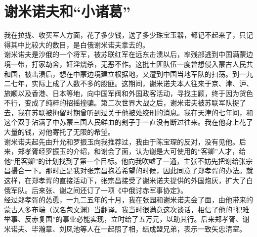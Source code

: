 \fancyhead[RO]{} %
\fancyhead[LE]{} %
\chapter*{谢米诺夫和“小诸葛”}
\thispagestyle{empty}
我在拉拢、收买军人方面，花了多少钱，送了多少珠宝玉器，都记不起来了，只记得其中比较大的数目，是白俄谢米诺夫拿去的。\\

谢米诺夫是沙俄的一个将军，被苏联红军在远东击溃以后，率残部逃到中国满蒙边境一带，打家劫舍，奸淫烧杀，无恶不作。这批土匪队伍一度曾想侵入蒙古人民共和国，被击溃后，想在中蒙边境建立根据地，又遭到中国当地军队的扫荡。到一九二七年，实际上成了人数不多的股匪。这期间，谢米诺夫本人往来于京、津、沪、旅顺以及香港、日本等地，向中国军阀和外国政客活动，寻找主顾，终于因为货色不行，变成了纯粹的招摇撞骗。第二次世界大战之后，谢米诺夫被苏联军队捉了去，我在苏联被拘留时期曾听到过关于他被处绞刑的消息。我在天津的七年间，和这个双手沾满了中苏蒙三国人民鲜血的刽子手一直没有断过往来。我在他身上花了大量的钱，对他寄托了无限的希望。\\

谢米诺夫起先由升允和罗振玉向我推荐过，我由于陈宝琛的反对，没有见他。后来，郑孝胥经罗振玉的介绍，和谢会了面，认为谢是大可使用的“客卿”人才，给他“用客卿”的计划找到了第一个目标。他向我吹嘘了一通，主张不妨先把谢给张宗昌撮合一下。那时正是我对张宗昌抱着希望的时候，因此同意了郑孝胥的办法。就这样，在郑孝胥的直接活动下，张宗昌接受了谢米诺夫提供的外国炮灰，扩大了白俄军队。后来张、谢之间还订了一项《中俄讨赤军事协定》。\\

经过郑孝胥的怂恿，一九二五年的十月，我在张园和谢米诺夫会了面，由他带来的蒙古人多布端（汉名包文渊）当翻译。我当时很满意这次谈话，相信了他的“犯难举事、反赤复国”的事业必能实现，立时给了五万元，以助其行。后来郑孝胥、谢米诺夫、毕瀚章、刘凤池等人在一起照了相，结成盟兄弟，表示一致矢忠清室。\\

